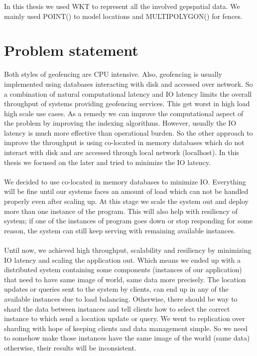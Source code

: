 \documentclass[a4]{report}
\begin{document}
    In this thesis we used WKT to represent all the involved gepspatial data.
    We mainly used POINT() to model locations and MULTIPOLYGON() for fences.

    \section{Problem statement}
    Both styles of geofencing are CPU intensive.
    Also, geofencing is usually implemented using databases interacting with disk and accessed over network.
    So a combination of natural computational latency and IO latency limits the overall throughput of systems
    providing geofencing services.
    This get worst in high load high scale use cases.
    As a remedy we can improve the computational aspect of the problem by improving the indexing algorithms.
    However, usually the IO latency is much more effective than operational burden.
    So the other approach to improve the throughput is using co-located in memory databases  which do not interact
    with disk and are accessed through local network (localhost).
    In this thesis we focused on the later and tried to minimize the IO latency.

    \paragraph{}
    We decided to use co-located in memory databases to minimize IO.
    Everything will be fine until our systems faces an amount of load which can not be handled properly even after scaling up.
    At this stage we scale the system out and deploy more than one instance of the program.
    This will also help with resiliency of system;
    if one of the instances of program goes down or stop responding for some reason, the system can still keep
    serving with remaining available instances.

    \paragraph{}
    Until now, we achieved high throughput, scalability and resiliency by minimizing IO latency and scaling the
    application out.
    Which means we ended up with a distributed system containing some components (instances of our application) that
    need to have same image of world, same data more precisely.
    The location updates or queries sent to the system by clients, can end up in any of the available instances due
    to load balancing.
    Otherwise, there should be way to shard the data between instances and tell clients how to select the correct
    instance to which send a location update or query.
    We went to replication over sharding with hope of keeping clients and data management simple.
    So we need to somehow make those instances have the same image of the world (same data) otherwise, their results
    will be inconsistent.
\end{document}
